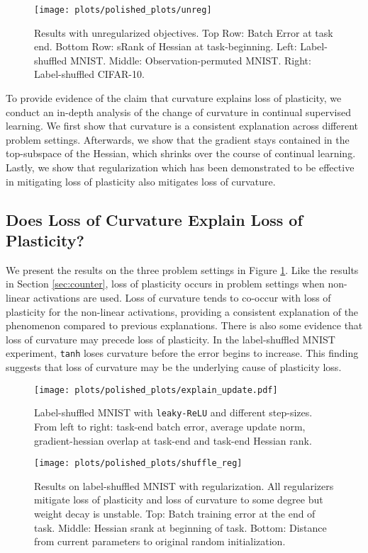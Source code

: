 \documentclass{article}
\begin{document}
\begin{figure}[h!]
  \centering
\texttt{[image: plots/polished\_plots/unreg]}
\caption{Results with unregularized objectives. Top Row: Batch Error at task end. Bottom Row: sRank of Hessian at task-beginning. Left: Label-shuffled MNIST. Middle: Observation-permuted MNIST. Right: Label-shuffled CIFAR-10.}
  \label{fig:unreg}
\end{figure}
To provide evidence of the claim that curvature explains loss of plasticity, we conduct an in-depth analysis of the change of curvature in continual supervised learning.
We first show that curvature is a consistent explanation across different problem settings.
Afterwards, we show that the gradient stays contained in the top-subspace of the Hessian, which shrinks over the course of continual learning.
Lastly, we show that regularization which has been demonstrated to be effective in mitigating loss of plasticity also mitigates loss of curvature.


\subsection{Does Loss of Curvature Explain Loss of Plasticity?}
\vspace{-2mm}

We present the results on the three problem settings in Figure \ref{fig:unreg}.
Like the results in Section \ref{sec:counter}, loss of plasticity occurs in problem settings when non-linear activations are used.
Loss of curvature tends to co-occur with loss of plasticity for the non-linear activations, providing a consistent explanation of the phenomenon compared to previous explanations.
There is also some evidence that loss of curvature may precede loss of plasticity.
In the label-shuffled MNIST experiment, \texttt{tanh} loses curvature before the error begins to increase.
This finding suggests that loss of curvature may be the underlying cause of plasticity loss.


\begin{figure}[h!]
  \centering
\texttt{[image: plots/polished\_plots/explain\_update.pdf]}
    \caption{Label-shuffled MNIST with \texttt{leaky-ReLU} and different step-sizes. From left to right: task-end batch error, average update norm, gradient-hessian overlap at task-end and task-end Hessian rank.}
  \label{fig:unreg_leaky_abl}
\end{figure}


\begin{figure}
  \centering
  \texttt{[image: plots/polished\_plots/shuffle\_reg]}

\caption{Results on label-shuffled MNIST with regularization. All regularizers mitigate loss of plasticity and loss of curvature to some degree but weight decay is unstable. Top: Batch training error at the end of task. Middle: Hessian srank at beginning of task. Bottom: Distance from current parameters to original random initialization.}
  \label{fig:shuffle_mnist_sgd_reg}
\end{figure}
\end{document}
